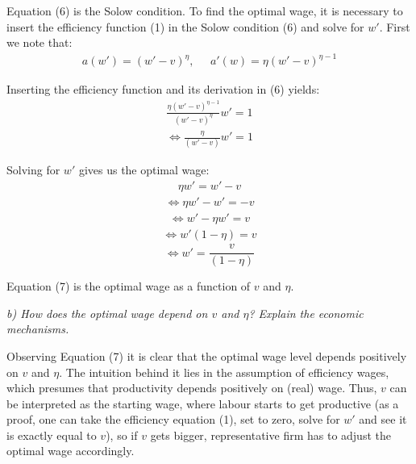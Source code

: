 \documentclass[11pt]{article} %
\begin{document}
\bigskip
Equation (6) is the Solow condition. To find the optimal wage, it is necessary to insert the efficiency function (1) in the Solow condition (6) and solve for $w'$. First we note that:
\begin{align*}
    a(w') = (w'-v)^{\eta}, \;\;\;\;\; a'(w) = \eta (w'-v)^{\eta-1}
\end{align*}

Inserting the efficiency function and its derivation in (6) yields:
\begin{align*}
    \frac {\eta (w'-v)^{\eta-1}} {(w'-v)^{\eta}} w' = 1
\end{align*}
\begin{align*}
    \Longleftrightarrow \frac {\eta} {(w'-v)} w' = 1
\end{align*}

Solving for $w'$ gives us the optimal wage:
\begin{align*}
    \eta w' = w'-v
\end{align*}
\begin{align*}
    \Longleftrightarrow \eta w' - w' = -v
\end{align*}
\begin{align*}
    \Longleftrightarrow w' - \eta w' = v
\end{align*}
\begin{align*}
    \Longleftrightarrow w'(1 - \eta) = v
\end{align*}
\begin{equation}
    \Longleftrightarrow w' = \frac{v} {(1 - \eta)}
\end{equation}

\bigskip
Equation (7) is the optimal wage as a function of $v$ and $\eta$.




\pagebreak
\textit{b) How does the optimal wage depend on $v$ and $\eta$? Explain the economic
mechanisms.}\par

\bigskip
Observing Equation (7) it is clear that the optimal wage level depends positively on $v$ and $\eta$. The intuition behind it lies in the assumption of efficiency wages, which presumes that productivity depends positively on (real) wage. Thus, $v$ can be interpreted as the starting wage, where labour starts to get productive (as a proof, one can take the efficiency equation (1), set to zero, solve for $w'$ and see it is exactly equal to $v$), so if $v$ gets bigger, representative firm has to adjust the optimal wage accordingly.\par
\end{document}
